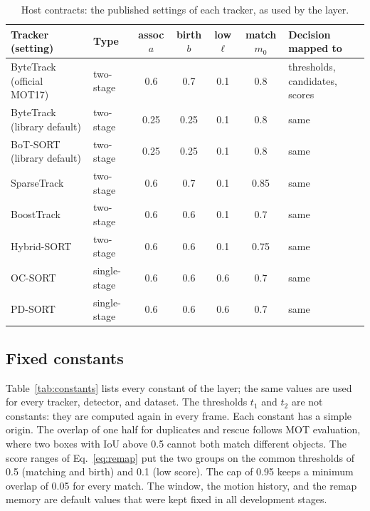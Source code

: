 \documentclass[pdflatex,referee,sn-mathphys-num]{sn-jnl}
\begin{document}
\begin{table}[t]
\caption{Host contracts: the published settings of each tracker, as used by
the layer.}
\label{tab:contracts}
\centering\footnotesize
\setlength{\tabcolsep}{4pt}
\begin{tabular}{@{}>{\raggedright\arraybackslash}p{30mm}lcccc>{\raggedright\arraybackslash}p{32mm}@{}}
\toprule
Tracker (setting) & Type & assoc $a$ & birth $b$ & low $\ell$ & match $m_0$ & Decision mapped to\\
\midrule
ByteTrack (official MOT17) & two-stage & 0.6 & 0.7 & 0.1 & 0.8 & thresholds, candidates, scores\\
ByteTrack (library default) & two-stage & 0.25 & 0.25 & 0.1 & 0.8 & same\\
BoT-SORT (library default) & two-stage & 0.25 & 0.25 & 0.1 & 0.8 & same\\
SparseTrack & two-stage & 0.6 & 0.7 & 0.1 & 0.85 & same\\
BoostTrack & two-stage & 0.6 & 0.6 & 0.1 & 0.7 & same\\
Hybrid-SORT & two-stage & 0.6 & 0.6 & 0.1 & 0.75 & same\\
OC-SORT & single-stage & 0.6 & 0.6 & 0.6 & 0.7 & same\\
PD-SORT & single-stage & 0.6 & 0.6 & 0.6 & 0.7 & same\\
\bottomrule
\end{tabular}
\end{table}

\subsection{Fixed constants}\label{sec:constants}
Table~\ref{tab:constants} lists every constant of the layer; the same values
are used for every tracker, detector, and dataset. The thresholds $t_1$ and
$t_2$ are not constants: they are computed again in every frame. Each
constant has a simple origin. The overlap of one half for duplicates and
rescue follows MOT evaluation, where two boxes with IoU above 0.5 cannot both
match different objects. The score ranges of Eq.~\eqref{eq:remap} put the two
groups on the common thresholds of 0.5 (matching and birth) and 0.1 (low
score). The cap of 0.95 keeps a minimum overlap of 0.05 for every match. The
window, the motion history, and the remap memory are default values that were
kept fixed in all development stages.
\end{document}
